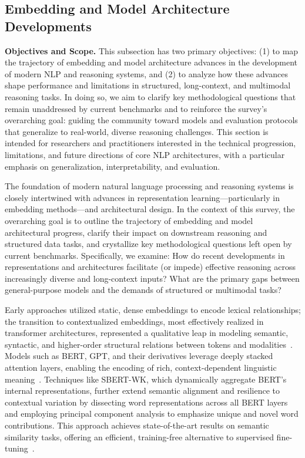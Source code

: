 \documentclass[sigconf]{acmart}
\begin{document}
\subsection{Embedding and Model Architecture Developments}

\textbf{Objectives and Scope.} This subsection has two primary objectives: (1) to map the trajectory of embedding and model architecture advances in the development of modern NLP and reasoning systems, and (2) to analyze how these advances shape performance and limitations in structured, long-context, and multimodal reasoning tasks. In doing so, we aim to clarify key methodological questions that remain unaddressed by current benchmarks and to reinforce the survey’s overarching goal: guiding the community toward models and evaluation protocols that generalize to real-world, diverse reasoning challenges. This section is intended for researchers and practitioners interested in the technical progression, limitations, and future directions of core NLP architectures, with a particular emphasis on generalization, interpretability, and evaluation.

The foundation of modern natural language processing and reasoning systems is closely intertwined with advances in representation learning---particularly in embedding methods---and architectural design. In the context of this survey, the overarching goal is to outline the trajectory of embedding and model architectural progress, clarify their impact on downstream reasoning and structured data tasks, and crystallize key methodological questions left open by current benchmarks. Specifically, we examine: How do recent developments in representations and architectures facilitate (or impede) effective reasoning across increasingly diverse and long-context inputs? What are the primary gaps between general-purpose models and the demands of structured or multimodal tasks?

Early approaches utilized static, dense embeddings to encode lexical relationships; the transition to contextualized embeddings, most effectively realized in transformer architectures, represented a qualitative leap in modeling semantic, syntactic, and higher-order structural relations between tokens and modalities~\cite{ref72,ref74,ref75,ref77}. Models such as BERT, GPT, and their derivatives leverage deeply stacked attention layers, enabling the encoding of rich, context-dependent linguistic meaning~\cite{ref100}. Techniques like SBERT-WK, which dynamically aggregate BERT’s internal representations, further extend semantic alignment and resilience to contextual variation by dissecting word representations across all BERT layers and employing principal component analysis to emphasize unique and novel word contributions. This approach achieves state-of-the-art results on semantic similarity tasks, offering an efficient, training-free alternative to supervised fine-tuning~\cite{ref77}.
\end{document}
